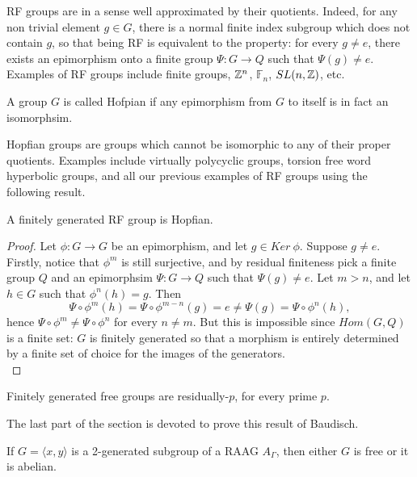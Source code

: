 RF groups are in a sense well approximated by their quotients. Indeed, for any non trivial element $g\in G$, there is a normal finite index subgroup which does not contain $g$, so that being RF is equivalent to the property: for every $g\neq e$, there exists an epimorphism onto a finite group $\Psi: G \rightarrow Q$ such that $\Psi(g)\neq e$.\\

Examples of RF groups include finite groups, $\mathbb Z^n$, $\mathbb F_n$, $SL(n,\mathbb Z)$, etc.

\begin{definition}
A group $G$ is called Hofpian if any epimorphism from $G$ to itself is in fact an isomorphsim.
\end{definition}

Hopfian groups are groups which cannot be isomorphic to any of their proper quotients. Examples include virtually polycyclic groups, torsion free word hyperbolic groups, and all our previous examples of RF groups using the following result.

\begin{prop}
A finitely generated RF group is Hopfian.
\end{prop}

\begin{proof}
Let $\phi: G \rightarrow G$ be an epimorphism, and let $g\in Ker \ \phi$. Suppose $g\neq e$. Firstly, notice that $\phi^m$ is still surjective, and by residual finiteness pick a finite group $Q$ and an epimorphsim $\Psi : G\rightarrow Q$ such that $\Psi(g)\neq e$. Let $m>n$, and let $h\in G$ such that $\phi^n(h)=g$. Then
\[ \Psi\circ\phi^m(h)=\Psi\circ\phi^{m-n}(g) = e\neq \Psi(g)=\Psi\circ\phi^n(h),\]
hence $\Psi\circ\phi^m\neq \Psi\circ\phi^n$ for every $n\neq m$. But this is impossible since $Hom(G,Q)$ is a finite set: $G$ is finitely generated so that a morphism is entirely determined by a finite set of choice for the images of the generators.\\ 
\end{proof}


\begin{prop}
Finitely generated free groups are residually-$p$, for every prime $p$.
\end{prop}

The last part of the section is devoted to prove this result of Baudisch.
\begin{thm}
If $G=\langle x, y \rangle$ is a 2-generated subgroup of a RAAG $A_\Gamma$, then either $G$ is free or it is abelian. 
\end{thm}

